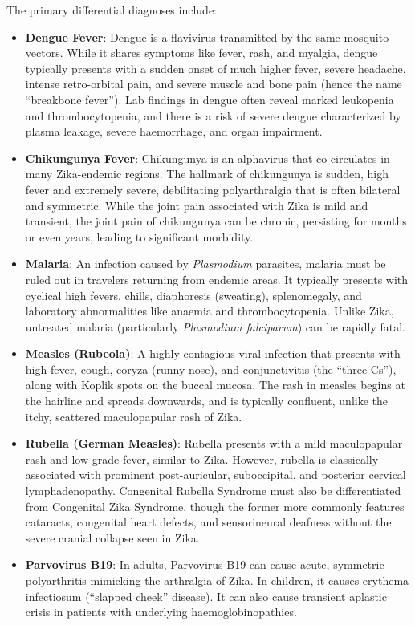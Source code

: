 The primary differential diagnoses include:
\begin{itemize}
    \item \textbf{Dengue Fever}: Dengue is a flavivirus transmitted by the same mosquito vectors. While it shares symptoms like fever, rash, and myalgia, dengue typically presents with a sudden onset of much higher fever, severe headache, intense retro-orbital pain, and severe muscle and bone pain (hence the name ``breakbone fever''). Lab findings in dengue often reveal marked leukopenia and thrombocytopenia, and there is a risk of severe dengue characterized by plasma leakage, severe haemorrhage, and organ impairment.
    \item \textbf{Chikungunya Fever}: Chikungunya is an alphavirus that co-circulates in many Zika-endemic regions. The hallmark of chikungunya is sudden, high fever and extremely severe, debilitating polyarthralgia that is often bilateral and symmetric. While the joint pain associated with Zika is mild and transient, the joint pain of chikungunya can be chronic, persisting for months or even years, leading to significant morbidity.
    \item \textbf{Malaria}: An infection caused by \textit{Plasmodium} parasites, malaria must be ruled out in travelers returning from endemic areas. It typically presents with cyclical high fevers, chills, diaphoresis (sweating), splenomegaly, and laboratory abnormalities like anaemia and thrombocytopenia. Unlike Zika, untreated malaria (particularly \textit{Plasmodium falciparum}) can be rapidly fatal.
    \item \textbf{Measles (Rubeola)}: A highly contagious viral infection that presents with high fever, cough, coryza (runny nose), and conjunctivitis (the ``three Cs''), along with Koplik spots on the buccal mucosa. The rash in measles begins at the hairline and spreads downwards, and is typically confluent, unlike the itchy, scattered maculopapular rash of Zika.
    \item \textbf{Rubella (German Measles)}: Rubella presents with a mild maculopapular rash and low-grade fever, similar to Zika. However, rubella is classically associated with prominent post-auricular, suboccipital, and posterior cervical lymphadenopathy. Congenital Rubella Syndrome must also be differentiated from Congenital Zika Syndrome, though the former more commonly features cataracts, congenital heart defects, and sensorineural deafness without the severe cranial collapse seen in Zika.
    \item \textbf{Parvovirus B19}: In adults, Parvovirus B19 can cause acute, symmetric polyarthritis mimicking the arthralgia of Zika. In children, it causes erythema infectiosum (``slapped cheek'' disease). It can also cause transient aplastic crisis in patients with underlying haemoglobinopathies.

\end{itemize}
